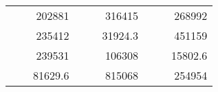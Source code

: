 \begin{table}[]
\begin{tabular}{|ccrccrccc}
\rowcolor[HTML]{DAE8FC} 
\multicolumn{1}{|c|}{\cellcolor[HTML]{FFFFC7}}                                & \multicolumn{1}{c|}{\cellcolor[HTML]{DAE8FC}}                      & \multicolumn{1}{r|}{\cellcolor[HTML]{DAE8FC}202881}    & \multicolumn{1}{c|}{\cellcolor[HTML]{FFFFC7}}                                & \multicolumn{1}{c|}{\cellcolor[HTML]{DAE8FC}}                       & \multicolumn{1}{r|}{\cellcolor[HTML]{DAE8FC}316415}    & \multicolumn{1}{c|}{\cellcolor[HTML]{FFFFC7}}                                & \multicolumn{1}{c|}{\cellcolor[HTML]{DAE8FC}}                      & \multicolumn{1}{r|}{\cellcolor[HTML]{DAE8FC}268992}    \\ \cline{3-3} \cline{6-6} \cline{9-9} 
\multicolumn{1}{|c|}{\cellcolor[HTML]{FFFFC7}}                                & \multicolumn{1}{c|}{\cellcolor[HTML]{DAE8FC}}                      & \multicolumn{1}{r|}{\cellcolor[HTML]{DDFDFF}235412}    & \multicolumn{1}{c|}{\cellcolor[HTML]{FFFFC7}}                                & \multicolumn{1}{c|}{\cellcolor[HTML]{DAE8FC}}                       & \multicolumn{1}{r|}{\cellcolor[HTML]{DDFDFF}31924.3}   & \multicolumn{1}{c|}{\cellcolor[HTML]{FFFFC7}}                                & \multicolumn{1}{c|}{\cellcolor[HTML]{DAE8FC}}                      & \multicolumn{1}{r|}{\cellcolor[HTML]{DDFDFF}451159}    \\ \cline{3-3} \cline{6-6} \cline{9-9} 
\rowcolor[HTML]{DAE8FC} 
\multicolumn{1}{|c|}{\cellcolor[HTML]{FFFFC7}}                                & \multicolumn{1}{c|}{\cellcolor[HTML]{DAE8FC}}                      & \multicolumn{1}{r|}{\cellcolor[HTML]{DAE8FC}239531}    & \multicolumn{1}{c|}{\cellcolor[HTML]{FFFFC7}}                                & \multicolumn{1}{c|}{\cellcolor[HTML]{DAE8FC}}                       & \multicolumn{1}{r|}{\cellcolor[HTML]{DAE8FC}106308}    & \multicolumn{1}{c|}{\cellcolor[HTML]{FFFFC7}}                                & \multicolumn{1}{c|}{\cellcolor[HTML]{DAE8FC}}                      & \multicolumn{1}{r|}{\cellcolor[HTML]{DAE8FC}15802.6}   \\ \cline{3-3} \cline{6-6} \cline{9-9} 
\multicolumn{1}{|c|}{\cellcolor[HTML]{FFFFC7}}                                & \multicolumn{1}{c|}{\cellcolor[HTML]{DAE8FC}}                      & \multicolumn{1}{r|}{\cellcolor[HTML]{DDFDFF}81629.6}   & \multicolumn{1}{c|}{\cellcolor[HTML]{FFFFC7}}                                & \multicolumn{1}{c|}{\cellcolor[HTML]{DAE8FC}}                       & \multicolumn{1}{r|}{\cellcolor[HTML]{DDFDFF}815068}    & \multicolumn{1}{c|}{\cellcolor[HTML]{FFFFC7}}                                & \multicolumn{1}{c|}{\cellcolor[HTML]{DAE8FC}}                      & \multicolumn{1}{r|}{\cellcolor[HTML]{DDFDFF}254954}    \\ \cline{3-3} \cline{6-6} \cline{9-9} 

\end{tabular}
\end{table}

